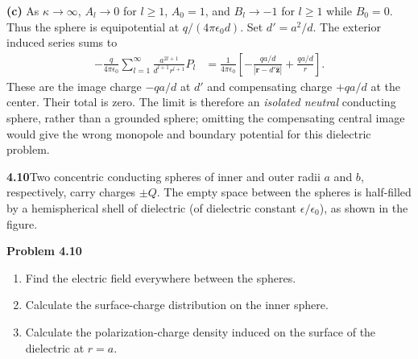 \textbf{(c)} As $\kappa\to\infty$, $A_l\to0$ for $l\geq1$,
$A_0=1$, and $B_l\to-1$ for $l\geq1$ while $B_0=0$.
Thus the sphere is equipotential at $q/(4\pi\epsilon_0d)$.
Set $d'=a^2/d$. The exterior induced series sums to
\begin{align*}
-\frac{q}{4\pi\epsilon_0}\sum_{l=1}^\infty
\frac{a^{2l+1}}{d^{l+1}r^{l+1}}P_l
&=\frac1{4\pi\epsilon_0}\left[
-\frac{qa/d}{|\mathbf r-d'\hat{\mathbf z}|}+\frac{qa/d}{r}\right].
\end{align*}
These are the image charge $-qa/d$ at $d'$ and compensating charge
$+qa/d$ at the center. Their total is zero. The limit is therefore
an \emph{isolated neutral} conducting sphere, rather than a grounded
sphere; omitting the compensating central image would give the wrong
monopole and boundary potential for this dielectric problem.

\par\bigskip
\noindent\textbf{4.10}\quad Two concentric conducting spheres of inner and outer radii $a$ and $b$, respectively, carry charges $\pm Q$. The empty space between the spheres is half-filled by a hemispherical shell of dielectric (of dielectric constant $\epsilon/\epsilon_{0}$), as shown in the figure.

\begin{center}
\par\vspace{0.5em}\textbf{Problem 4.10}
\end{center}

\begin{enumerate}
\item[(a)] Find the electric field everywhere between the spheres.
\item[(b)] Calculate the surface-charge distribution on the inner sphere.
\item[(c)] Calculate the polarization-charge density induced on the surface of the dielectric at $r=a$.
\end{enumerate}
\solution

